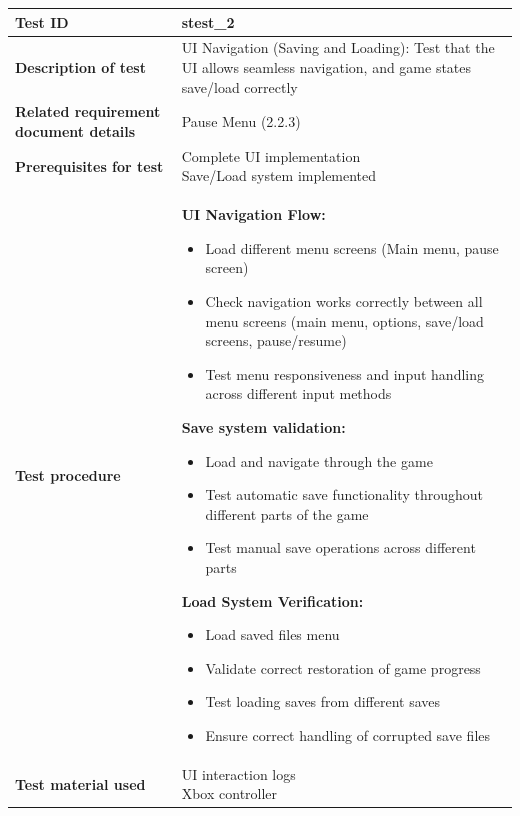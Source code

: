 \documentclass[11pt, a4paper]{article}
\begin{document}
\begin{center}
\begin{tabularx}{\linewidth}{|>{\raggedright\arraybackslash}m{4cm}|X|}
    \hline
    \textbf{Test ID} & stest\_2 \\
    \hline
    \textbf{Description of test} & UI Navigation (Saving and Loading): Test that the UI allows seamless navigation, and game states save/load correctly \\
    \hline
    \textbf{Related requirement document details} & Pause Menu (2.2.3) \\
    \hline
    \textbf{Prerequisites for test} & \makecell[l]{
        Complete UI implementation \\
        Save/Load system implemented
    }
    \\
    \hline
    \textbf{Test procedure} &
    \textbf{UI Navigation Flow:}
    \begin{itemize}
        \item Load different menu screens (Main menu, pause screen)
        \item Check navigation works correctly between all menu screens (main menu, options, save/load screens, pause/resume)
        \item Test menu responsiveness and input handling across different input methods
    \end{itemize}
    \textbf{Save system validation:}
    \begin{itemize}
        \item Load and navigate through the game
        \item Test automatic save functionality throughout different parts of the game
        \item Test manual save operations across different parts
    \end{itemize}
    \textbf{Load System Verification:}
    \begin{itemize}
        \item Load saved files menu
        \item Validate correct restoration of game progress
        \item Test loading saves from different saves
        \item Ensure correct handling of corrupted save files
    \end{itemize}
    \\
    \hline
    \textbf{Test material used} & \makecell[l] {
        UI interaction logs \\
        Xbox controller
}
\end{tabularx}
\end{center}
\end{document}
